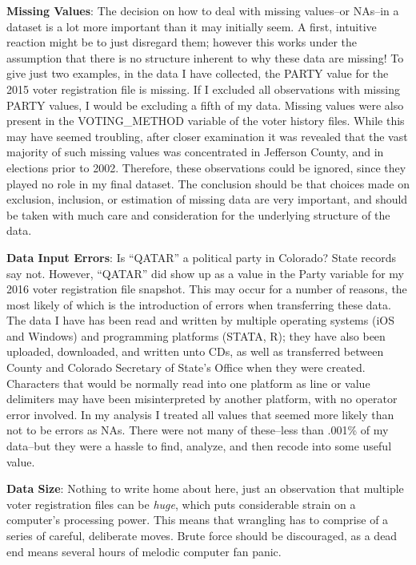 \documentclass[12pt,twoside]{reedthesis}
\begin{document}
  \textbf{Missing Values}: The decision on how to deal with missing
  values--or NAs--in a dataset is a lot more important than it may
  initially seem. A first, intuitive reaction might be to just disregard
  them; however this works under the assumption that there is no structure
  inherent to why these data are missing! To give just two examples, in
  the data I have collected, the PARTY value for the 2015 voter
  registration file is missing. If I excluded all observations with
  missing PARTY values, I would be excluding a fifth of my data. Missing
  values were also present in the VOTING\_METHOD variable of the voter
  history files. While this may have seemed troubling, after closer
  examination it was revealed that the vast majority of such missing
  values was concentrated in Jefferson County, and in elections prior to
  2002. Therefore, these observations could be ignored, since they played
  no role in my final dataset. The conclusion should be that choices made
  on exclusion, inclusion, or estimation of missing data are very
  important, and should be taken with much care and consideration for the
  underlying structure of the data.
  
  \textbf{Data Input Errors}: Is ``QATAR'' a political party in Colorado?
  State records say not. However, ``QATAR'' did show up as a value in the
  Party variable for my 2016 voter registration file snapshot. This may
  occur for a number of reasons, the most likely of which is the
  introduction of errors when transferring these data. The data I have has
  been read and written by multiple operating systems (iOS and Windows)
  and programming platforms (STATA, R); they have also been uploaded,
  downloaded, and written unto CDs, as well as transferred between County
  and Colorado Secretary of State's Office when they were created.
  Characters that would be normally read into one platform as line or
  value delimiters may have been misinterpreted by another platform, with
  no operator error involved. In my analysis I treated all values that
  seemed more likely than not to be errors as NAs. There were not many of
  these--less than .001\% of my data--but they were a hassle to find,
  analyze, and then recode into some useful value.
  
  \textbf{Data Size}: Nothing to write home about here, just an
  observation that multiple voter registration files can be \emph{huge},
  which puts considerable strain on a computer's processing power. This
  means that wrangling has to comprise of a series of careful, deliberate
  moves. Brute force should be discouraged, as a dead end means several
  hours of melodic computer fan panic.
  
\end{document}
